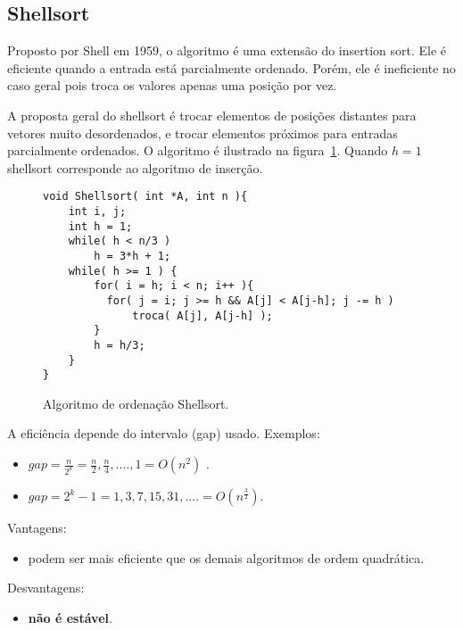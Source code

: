 \subsection{Shellsort}

Proposto por Shell em 1959, o algoritmo é uma extensão do insertion sort.
Ele é eficiente quando a entrada está parcialmente ordenado.
Porém, ele é  ineficiente no caso geral pois troca os valores apenas uma posição por vez.

A proposta geral do shellsort é trocar elementos de posições distantes para vetores muito
desordenados, e trocar elementos próximos para entradas parcialmente ordenados.
O algoritmo é ilustrado na figura~\ref{aula03:algo:shellsort}.
Quando $h = 1$ shellsort corresponde ao algoritmo de inserção.
\begin{figure}[!htb]
\centering
\begin{framed}
\begin{lstlisting}
void Shellsort( int *A, int n ){
	int i, j;
	int h = 1;
	while( h < n/3 )
		h = 3*h + 1;
	while( h >= 1 ) {
		for( i = h; i < n; i++ ){
		  for( j = i; j >= h && A[j] < A[j-h]; j -= h )
	  		  troca( A[j], A[j-h] );
		}
		h = h/3;
	}
}
\end{lstlisting}
\end{framed}
\caption{Algoritmo de ordenação Shellsort.}
\label{aula03:algo:shellsort}
\end{figure}


A eficiência depende do intervalo (gap) usado. Exemplos:
\begin{itemize}
\item $gap = \frac{n}{2^k} = \frac{n}{2}, \frac{n}{4}, ...., 1 = O(n^2)$ .
\item $gap = 2^k - 1 = 1,3,7,15,31,.... = O(n^{\frac{3}{2}})$.
\end{itemize}

Vantagens:
\begin{itemize}
\item podem ser mais eficiente que os demais algoritmos de ordem quadrática.
\end{itemize}
Desvantagens:
\begin{itemize}
\item {\bf não é estável}.
\end{itemize}


